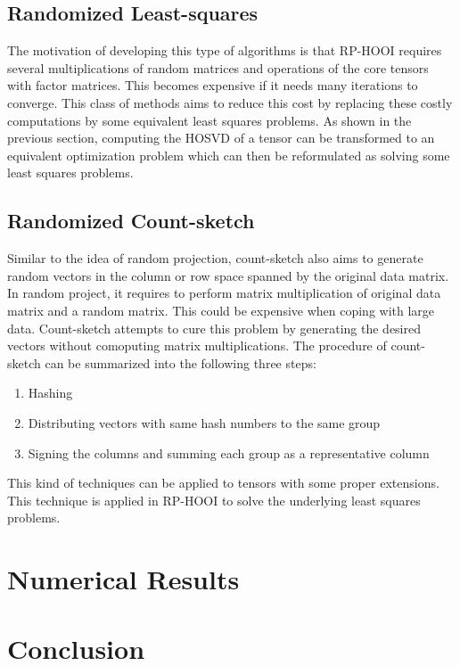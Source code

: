 \documentclass[preprint]{elsarticle}
\begin{document}
\subsection{Randomized Least-squares}
\noindent The motivation of developing this type of algorithms is that RP-HOOI requires several multiplications of random matrices and operations of the core tensors
with factor matrices. This becomes expensive if it needs many iterations to converge. This class of methods aims to reduce this cost by
replacing these costly computations by some equivalent least squares problems. As shown in the previous section, computing the HOSVD of a tensor
can be transformed to an equivalent optimization problem which can then be reformulated as solving some least squares problems.
\subsection{Randomized Count-sketch}
\noindent Similar to the idea of random projection, count-sketch also aims to generate random vectors in the column 
or row space spanned by the original data matrix. In random project, it requires to perform matrix multiplication of original data matrix
and a random matrix. This could be expensive when coping with large data. Count-sketch attempts to cure this problem by generating the desired
vectors without comoputing matrix multiplications. The procedure of count-sketch can be summarized into the
following three steps:
\begin{enumerate}
    \item Hashing
    \item Distributing vectors with same hash numbers to the same group
    \item Signing the columns and summing each group as a representative column
\end{enumerate}
This kind of techniques can be applied to tensors with some proper extensions. This technique is applied in RP-HOOI
to solve the underlying least squares problems.
\section{Numerical Results}

\section{Conclusion}


\end{document}
